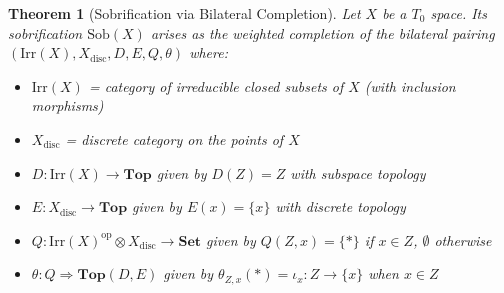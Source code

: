 \documentclass[11pt]{article}
\theoremstyle{plain}
\newtheorem{theorem}{Theorem}[section]
\theoremstyle{definition}
\theoremstyle{remark}
\newcommand{\op}{\mathrm{op}}
\begin{document}
\begin{theorem}[Sobrification via Bilateral Completion]\label{thm:sobrification-bilateral}
Let $X$ be a $T_0$ space. Its sobrification $\text{Sob}(X)$ arises as the weighted completion of the bilateral pairing $(\mathrm{Irr}(X), X_{\text{disc}}, D, E, Q, \theta)$ where:
\begin{itemize}
\item $\mathrm{Irr}(X)$ = category of irreducible closed subsets of $X$ (with inclusion morphisms)
\item $X_{\text{disc}}$ = discrete category on the points of $X$
\item $D : \mathrm{Irr}(X) \to \mathbf{Top}$ given by $D(Z) = Z$ with subspace topology
\item $E : X_{\text{disc}} \to \mathbf{Top}$ given by $E(x) = \{x\}$ with discrete topology
\item $Q : \mathrm{Irr}(X)^{\op} \otimes X_{\text{disc}} \to \mathbf{Set}$ given by $Q(Z, x) = \{*\}$ if $x \in Z$, $\emptyset$ otherwise
\item $\theta : Q \Rightarrow \mathbf{Top}(D, E)$ given by $\theta_{Z,x}(*) = \iota_x : Z \to \{x\}$ when $x \in Z$
\end{itemize}
\end{theorem}
\end{document}
